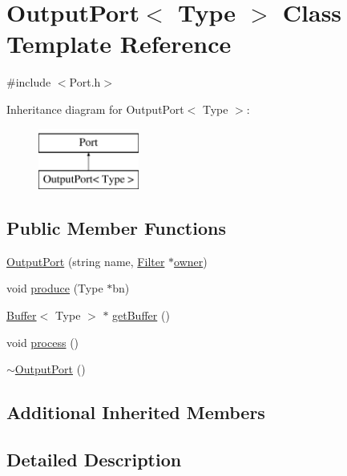\hypertarget{classOutputPort}{\section{Output\-Port$<$ Type $>$ Class Template Reference}
\label{classOutputPort}
}


{\ttfamily \#include $<$Port.\-h$>$}

Inheritance diagram for Output\-Port$<$ Type $>$\-:\begin{figure}[H]
\begin{center}
\leavevmode
\includegraphics[height=2.000000cm]{classOutputPort}
\end{center}
\end{figure}
\subsection*{Public Member Functions}
\begin{DoxyCompactItemize}
\item 
\hyperlink{classOutputPort_a4126611ec1f6190719f6647e64f9a668}{Output\-Port} (string name, \hyperlink{classFilter}{Filter} $\ast$\hyperlink{classPort_a09f3613b92c0d46d0aa8c3239102a3ca}{owner})
\item 
void \hyperlink{classOutputPort_a18fe6d7d5be0a04f23b9048124553fa3}{produce} (Type $\ast$bn)
\item 
\hyperlink{classBuffer}{Buffer}$<$ Type $>$ $\ast$ \hyperlink{classOutputPort_a0bd9c526a6d3848fd5ecdcc4935c3f43}{get\-Buffer} ()
\item 
void \hyperlink{classOutputPort_a2d205a671f55bb81e8bf4abe68210e27}{process} ()
\item 
\hyperlink{classOutputPort_ac77e96c8a7b605b011043efdc5a905df}{$\sim$\-Output\-Port} ()
\end{DoxyCompactItemize}
\subsection*{Additional Inherited Members}


\subsection{Detailed Description}
